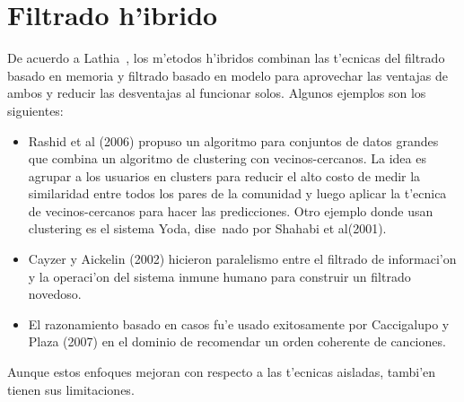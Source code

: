 \documentclass[11pt]{article}
\begin{document}
\section{Filtrado h'ibrido}

De acuerdo a Lathia~\cite{recsys:nlathia}, los m'etodos h'ibridos combinan las t'ecnicas del filtrado basado en memoria y filtrado basado en modelo para aprovechar las ventajas de ambos y reducir las desventajas al funcionar solos. Algunos ejemplos son los siguientes:

\begin{itemize}
\item Rashid et al (2006) propuso un algoritmo para conjuntos de datos grandes que combina un algoritmo de clustering con vecinos-cercanos. La idea es agrupar a los usuarios en clusters para reducir el alto costo de medir la similaridad entre todos los pares de la comunidad y luego aplicar la t'ecnica de vecinos-cercanos para hacer las predicciones. Otro ejemplo donde usan clustering es el sistema Yoda, dise~nado por Shahabi et al(2001).
\item Cayzer y Aickelin (2002) hicieron paralelismo entre el filtrado de informaci'on y la operaci'on del sistema inmune humano para construir un filtrado novedoso.
\item El razonamiento basado en casos fu'e usado exitosamente por Caccigalupo y Plaza (2007) en el dominio de recomendar un orden coherente de canciones.
\end{itemize}

Aunque estos enfoques mejoran con respecto a las t'ecnicas aisladas, tambi'en tienen sus limitaciones.
\end{document}
